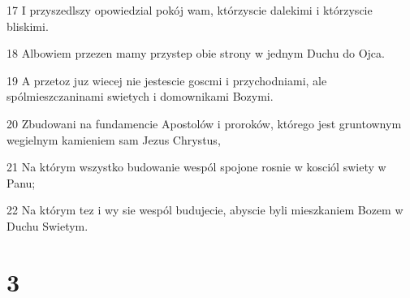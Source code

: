 \par 17 I przyszedlszy opowiedzial pokój wam, którzyscie dalekimi i którzyscie bliskimi.
\par 18 Albowiem przezen mamy przystep obie strony w jednym Duchu do Ojca.
\par 19 A przetoz juz wiecej nie jestescie goscmi i przychodniami, ale spólmieszczaninami swietych i domownikami Bozymi.
\par 20 Zbudowani na fundamencie Apostolów i proroków, którego jest gruntownym wegielnym kamieniem sam Jezus Chrystus,
\par 21 Na którym wszystko budowanie wespól spojone rosnie w kosciól swiety w Panu;
\par 22 Na którym tez i wy sie wespól budujecie, abyscie byli mieszkaniem Bozem w Duchu Swietym.

\chapter{3}

